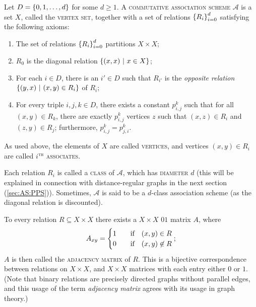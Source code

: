 \documentclass{report}
\newcommand{\AS}{\mathcal{A}}
\begin{document}
    \begin{defn}
      \label{association-scheme-comb}
      Let $D = \left\lbrace 0, 1, \ldots, d \right\rbrace$ for some $d \geq 1$.
      A \textsc{commutative association scheme} $\AS$ is a set $X$, called the
      \textsc{vertex set}, together with a set of relations $\left\lbrace R_i \right\rbrace_{i=0}^d$
      satisfying the following axioms:
      \begin{enumerate}
        \item The set of relations $\left\lbrace R_i \right\rbrace_{i=0}^d$ partitions $X \times X$;
          \label{cAS-part}
        \item $R_0$ is the diagonal relation $\left\lbrace  (x, x) \ \middle| \ x \in X  \right\rbrace$;
          \label{cAS-diag}
        \item For each $i \in D$, there is an $i' \in D$ such that $R_{i'}$ is
          the \textit{opposite relation} $\left\lbrace  (y, x) \ \middle| \ (x, y) \in R_i  \right\rbrace$ of
          $R_i$;
          \label{cAS-sym}
        \item For every triple $i, j, k \in D$, there exists a constant $p_{i,
          j}^k$ such that for all $(x, y) \in R_k$, there are exactly $p_{i,
          j}^k$ vertices $z$ such that $(x, z) \in R_i$ and $(z, y) \in R_j$;
          furthermore, $p_{i, j}^k = p_{j, i}^k$.
          \label{cAS-reg}
      \end{enumerate}

      As used above, the elements of $X$ are called \textsc{vertices},
      and vertices $(x, y) \in R_i$ are called \textsc{$i^\text{th}$ associates}.

      Each relation $R_i$ is called a \textsc{class} of $\AS$, which has
      \textsc{diameter} $d$ (this will be explained in connection with
      distance-regular graphs in the next section (\ref{sec:AS:PPS})).
      Sometimes, $\AS$ is said to be a $d$-class association scheme (as the
      diagonal relation is discounted).
    \end{defn}

    To every relation $R \subseteq X \times X$ there exists a $X \times X$ $01$
    matrix $A$, where
    \begin{equation}\label{adjacency-matrix}
      A_{xy} = \begin{cases}
        1 & \quad\text{if}\quad (x, y) \in R \\
        0 & \quad\text{if}\quad (x, y) \not\in R \\
      \end{cases};
    \end{equation}
    $A$ is then called the \textsc{adjacency matrix} of $R$.
    This is a bijective correspondence between relations on $X \times X$,
    and $X \times X$ matrices with each entry either $0$ or $1$.
    (Note that binary relations are precisely directed graphs without parallel
    edges, and this usage of the term \textit{adjacency matrix} agrees with its
    usage in graph theory.)
\end{document}
